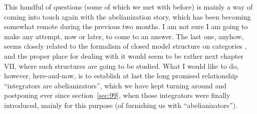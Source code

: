 \label{sec:135}%
This handful of questions (some of which we met with before) is mainly
a way of coming into touch again with the abelianization story, which
has been becoming somewhat remote during the previous two months. I am
not sure I am going to make any attempt, now or later, to
come to an answer. The last one, anyhow, seems closely related to the
formalism of closed model structure on categories \Ahat, and the
proper place for dealing with it would seem to be rather next chapter
VII, where such structures are going to be
studied. What I would like to do, however, here-and-now, is to
establish at last the long promised relationship ``integrators are
abelianizators'', which we have kept turning around and postponing
ever since section~\ref{sec:99}, when those integrators were finally
introduced, mainly for this purpose (of furnishing us with
``abelianizators'').

